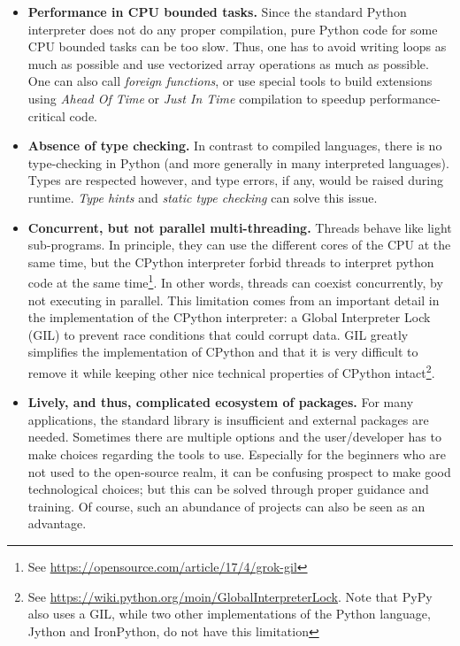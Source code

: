 \begin{itemize}

\item \textbf{Performance in CPU bounded tasks.} Since the standard Python
	interpreter does not do any proper compilation, pure Python code for
	some CPU bounded tasks can be too slow. Thus, one has to avoid writing
	loops as much as possible and use vectorized array operations as much
	as possible. One can also call \emph{foreign functions}, or use special
	tools to build extensions using \emph{Ahead Of Time} or \emph{Just In
	Time} compilation to speedup performance-critical code.

\item \textbf{Absence of type checking.} In contrast to compiled languages,
	there is no type-checking in Python (and more generally in many
	interpreted languages). Types are respected however, and type errors,
	if any, would be raised during runtime.
	\emph{Type hints} and \emph{static type checking} can solve this issue.

\item \textbf{Concurrent, but not parallel multi-threading.} Threads behave
	like light sub-programs. In principle, they can use the different cores
	of the CPU at the same time, but the CPython interpreter forbid threads
	to interpret python code at the same time\footnote{See
	\url{https://opensource.com/article/17/4/grok-gil}
	}. In other words, threads can coexist concurrently, by not executing in
	parallel.
%
This limitation comes from an important detail in the implementation of the
CPython interpreter: a Global Interpreter Lock (GIL) to prevent race conditions
that could corrupt data.
%
GIL greatly simplifies the implementation of CPython and that
it is very difficult to remove it while keeping other nice technical properties
of CPython intact\footnote{See
\url{https://wiki.python.org/moin/GlobalInterpreterLock}. Note that PyPy
also uses a GIL, while two other implementations of the Python language, Jython
and IronPython, do not have this limitation}.

\item \textbf{Lively, and thus, complicated ecosystem of packages.} For many
	applications, the standard library is insufficient and external
	packages are needed. Sometimes there are multiple options and the
	user/developer has to make choices regarding the tools to use.
	Especially for the beginners who are not used to the open-source realm,
	it can be confusing prospect to make good technological choices; but
	this can be solved through proper guidance and training.
	Of course, such an abundance of projects can also be seen as an advantage.

\end{itemize}

